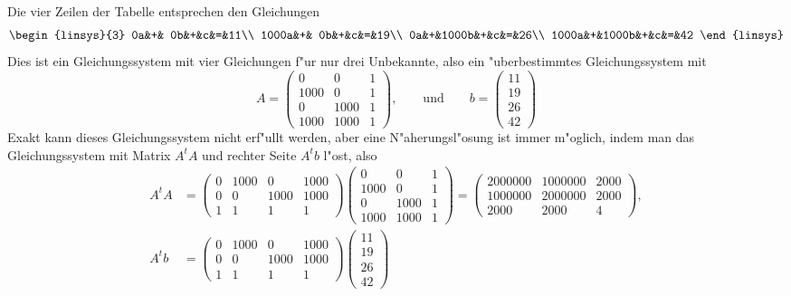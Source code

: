 \begin{loesung}
Die vier Zeilen der Tabelle entsprechen den Gleichungen
\[
\begin{linsys}{3}
   0a&+&   0b&+&c&=&11\\
1000a&+&   0b&+&c&=&19\\
   0a&+&1000b&+&c&=&26\\
1000a&+&1000b&+&c&=&42
\end{linsys}
\]
Dies ist ein Gleichungssystem mit vier Gleichungen f"ur nur drei Unbekannte,
also ein "uberbestimmtes Gleichungssystem mit
\[
A=\begin{pmatrix}
   0&   0&1\\
1000&   0&1\\
   0&1000&1\\
1000&1000&1
\end{pmatrix}
,\qquad\text{und}\qquad b=\begin{pmatrix}
11\\
19\\
26\\
42
\end{pmatrix}
\]
Exakt kann dieses Gleichungssystem nicht erf"ullt werden, aber eine
N"aherungs\-l"osung ist immer m"oglich, indem man das Gleichungssystem
mit Matrix $A^tA$ und rechter Seite $A^tb$ l"ost, also
\begin{align*}
A^tA&=
\begin{pmatrix}
0&1000&   0&1000\\
0&   0&1000&1000\\
1&   1&   1&   1
\end{pmatrix}
\begin{pmatrix}
   0&   0&1\\
1000&   0&1\\
   0&1000&1\\
1000&1000&1
\end{pmatrix}
=
\begin{pmatrix}
2000000&1000000&2000\\
1000000&2000000&2000\\
   2000&   2000&   4
\end{pmatrix},
\\
A^tb&=
\begin{pmatrix}
0&1000&   0&1000\\
0&   0&1000&1000\\
1&   1&   1&   1
\end{pmatrix}
\begin{pmatrix}
11\\19\\26\\42

\end{pmatrix}
\end{align*}
\end{loesung}
